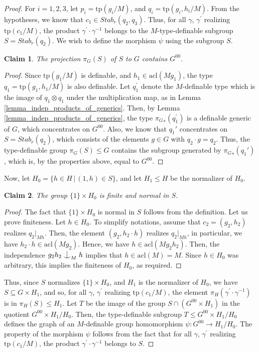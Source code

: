 \documentclass[12pt]{article}
\newcommand{\tpp}{\mathrm{tp}}
\newcommand{\acl}{\mathrm{acl}}
\newcommand{\0}{\emptyset}
\def\forkindep{\mathrel{\raise0.2ex\hbox{\ooalign{\hidewidth$\vert$\hidewidth\cr\raise-0.9ex\hbox{$\smile$}}}}}
\theoremstyle{plain}%
\newtheorem{claim}{Claim}
\theoremstyle{definition}
\theoremstyle{remark}
\begin{document}
\begin{proof}\setcounter{claim}{0}
    For $i=1,2,3$, let $p_i = \tpp(g_i / M)$, and $q_i = \tpp(g_i, h_i / M)$. From the hypotheses, we know that $c_1 \in Stab_r(q_2, q_3)$. Thus, for all $\gamma$, $\gamma^{'}$ realizing $\tpp(c_1 / M)$, the product $\gamma^{'} \cdot \gamma^{-1}$ belongs to the $M$-type-definable subgroup $S=Stab_r(q_2) $. We wish to define the morphism $\psi$ using the subgroup $S$. 

    \begin{claim}
        The projection $\pi_G(S)$ of $S$ to $G$ contains $G^{00}$. 
    \end{claim}
    \begin{proof}
        Since $\tpp(g_1 / M)$ is definable, and $h_1 \in \acl(M g_1)$, the type $q_1=\tpp(g_1, h_1 / M)$ is also definable. Let $q^{'}_1$ denote the $M$-definable type which is the image of $q_1 \otimes q_1$ under the multiplication map, as in Lemma \ref{lemma_indep_products_of_generics}. 
        Then, by Lemma \ref{lemma_indep_products_of_generics}, the type ${\pi_G}_*(q^{'}_1)$ is a definable generic of $G$, which concentrates on $G^{00}$. 
        Also, we know that $q_1'$ concentrates on $S=Stab_r(q_2)$, which consists of the elements $g\in G$ with $q_2\cdot g = q_2$. Thus, the type-definable group $\pi_G(S) \leq G$ contains the subgroup generated by ${\pi_G}_*(q_1')$, which is, by the properties above, equal to $G^{00}$. 
    \end{proof}

Now, let $H_0 = \lbrace h \in H \, | \, (1, h) \in S \rbrace$, and let $H_1 \leq H$ be the normalizer of $H_0$.

\begin{claim}
    The group $\lbrace 1 \rbrace \times H_0$ is finite and normal in $S$.
\end{claim}
\begin{proof}
    The fact that $\lbrace 1 \rbrace \times H_0$ is normal in $S$ follows from the definition. Let us prove finiteness. 
    Let $h \in H_0$. To simplify notations, assume that $c_2= (g_2, h_2)$ realizes $q_2|_{Mh}$. Then, the element $(g_2, h_2 \cdot h)$ realizes $q_2|_{Mh}$, in particular, we have $h_2 \cdot h \in \acl(M g_2)$. Hence, we have $h \in \acl(M g_2 h_2)$. Then, the independence $g_2 h_2 \forkindep_M h$ implies that $h \in \acl(M) = M$. Since $h \in H_0$ was arbitrary, this implies the finiteness of $H_0$, as required.
\end{proof}

Thus, since $S$ normalizes $\lbrace 1 \rbrace \times H_0$, and $H_1$ is the normalizer of $H_0$, we have $S \subseteq G \times H_1$, and so, for all $\gamma$, $\gamma^{'}$ realizing $\tpp(c_1 / M)$, the element $\pi_H(\gamma^{'} \cdot \gamma^{-1})$ is in $\pi_H(S) \leq H_1$. Let $T$ be the image of the group $S\cap (G^{00} \times H_1)$ in the quotient $G^{00} \times H_1 / H_0$. Then, the type-definable subgroup $T \leq G^{00} \times H_1 / H_0$ defines the graph of an $M$-definable group homomorphism $\psi: G^{00} \rightarrow H_1 / H_0$. The property of the morphism $\psi$ follows from the fact that for all $\gamma$, $\gamma^{'}$ realizing $\tpp(c_1 / M)$, the product $\gamma^{'} \cdot \gamma^{-1}$ belongs to $S$.    
\end{proof}
\end{document}

